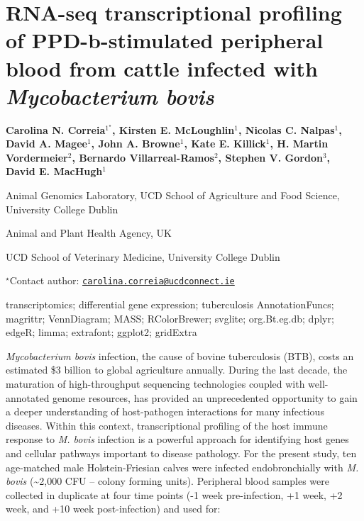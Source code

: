 \documentclass[\main/boa.tex]{subfiles}
\begin{document}
\section{RNA-seq transcriptional profiling of PPD-b-stimulated peripheral blood
from cattle infected with \emph{Mycobacterium bovis}}

\begin{center}
  {\bf Carolina N. Correia$^{1^\star}$, Kirsten E. McLoughlin$^{1}$, Nicolas C. Nalpas$^{1}$, David A. Magee$^{1}$, John A. Browne$^{1}$, Kate E. Killick$^{1}$, H. Martin Vordermeier$^{2}$, Bernardo Villarreal-Ramos$^{2}$, Stephen V. Gordon$^{3}$, David E. MacHugh$^{1}$}
\end{center}

\vskip 0.3cm

\begin{affiliations}
\begin{enumerate}
\begin{minipage}{0.915\textwidth}
\centering
\item Animal Genomics Laboratory, UCD School of Agriculture and Food Science,
University College Dublin \\[-2pt]
\item Animal and Plant Health Agency, UK \\[-2pt]
\item UCD School of Veterinary Medicine, University College Dublin \\[-2pt]
\end{minipage}
\end{enumerate}
$^\star$Contact author: \href{mailto:carolina.correia@ucdconnect.ie}{\nolinkurl{carolina.correia@ucdconnect.ie}}\\
\end{affiliations}

\vskip 0.5cm

\begin{minipage}{0.915\textwidth}
\keywords transcriptomics; differential gene expression; tuberculosis
\packages AnnotationFuncs; magrittr; VennDiagram; MASS; RColorBrewer; svglite;
org.Bt.eg.db; dplyr; edgeR; limma; extrafont; ggplot2; gridExtra
\end{minipage}

\vskip 0.8cm

\emph{Mycobacterium bovis} infection, the cause of bovine tuberculosis
(BTB), costs an estimated \$3 billion to global agriculture annually.
During the last decade, the maturation of high-throughput sequencing
technologies coupled with well-annotated genome resources, has provided
an unprecedented opportunity to gain a deeper understanding of
host-pathogen interactions for many infectious diseases. Within this
context, transcriptional profiling of the host immune response to
\emph{M. bovis} infection is a powerful approach for identifying host
genes and cellular pathways important to disease pathology. For the
present study, ten age-matched male Holstein-Friesian calves were
infected endobronchially with \emph{M. bovis} (\textasciitilde{}2,000
CFU -- colony forming units). Peripheral blood samples were collected in
duplicate at four time points (-1 week pre-infection, +1 week, +2 week,
and +10 week post-infection) and used for:
\end{document}
